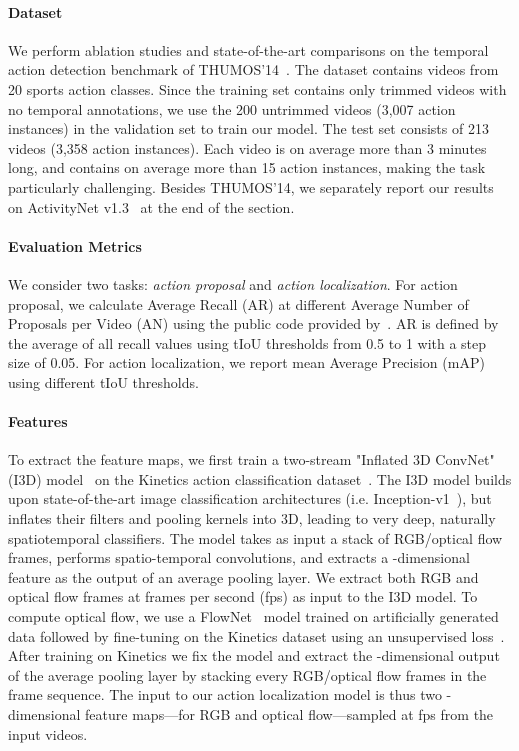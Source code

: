 \documentclass[10pt,twocolumn,letterpaper]{article}
\begin{document}
\paragraph{Dataset} We perform ablation studies and state-of-the-art
comparisons on the temporal action detection benchmark of
THUMOS'14~\cite{THUMOS14}. The dataset contains videos from 20 sports action
classes. Since the training set contains only trimmed videos with no temporal
annotations, we use the 200 untrimmed videos (3,007 action instances) in the
validation set to train our model. The test set consists of 213 videos (3,358
action instances). Each video is on average more than 3 minutes long, and
contains on average more than 15 action instances, making the task particularly
challenging. Besides THUMOS'14, we separately report our results on ActivityNet
v1.3~\cite{caba_heilbron:cvpr2015} at the end of the section.

\vspace{-3mm}

\paragraph{Evaluation Metrics} We consider two tasks: \textit{action proposal}
and \textit{action localization}. For action proposal, we calculate Average
Recall (AR) at different Average Number of Proposals per Video (AN) using the
public code provided by~\cite{escorcia:eccv2016}. AR is defined by the average
of all recall values using tIoU thresholds from 0.5 to 1 with a step size of
0.05. For action localization, we report mean Average Precision (mAP) using
different tIoU thresholds.

\vspace{-3mm}

\paragraph{Features} To extract the feature maps, we first train a two-stream
"Inflated 3D ConvNet" (I3D) model~\cite{carreira:cvpr2017} on the Kinetics
action classification dataset~\cite{kay:arxiv2017}. The I3D model builds upon
state-of-the-art image classification architectures (i.e.
Inception-v1~\cite{szegedy:cvpr2015}), but inflates their filters and pooling
kernels into 3D, leading to very deep, naturally spatiotemporal classifiers.
The model takes as input a stack of  RGB/optical flow frames, performs
spatio-temporal convolutions, and extracts a -dimensional feature as the
output of an average pooling layer. We extract both RGB and optical flow frames
at  frames per second (fps) as input to the I3D model. To compute optical
flow, we use a FlowNet~\cite{dosovitskiy:iccv2015} model trained on
artificially generated data followed by fine-tuning on the Kinetics dataset
using an unsupervised loss~\cite{vijayanarasimhan:arxiv2017}. After training on
Kinetics we fix the model and extract the -dimensional output of the
average pooling layer by stacking every  RGB/optical flow frames in the
frame sequence. The input to our action localization model is thus two
-dimensional feature maps---for RGB and optical flow---sampled at 
fps from the input videos. 
\end{document}
